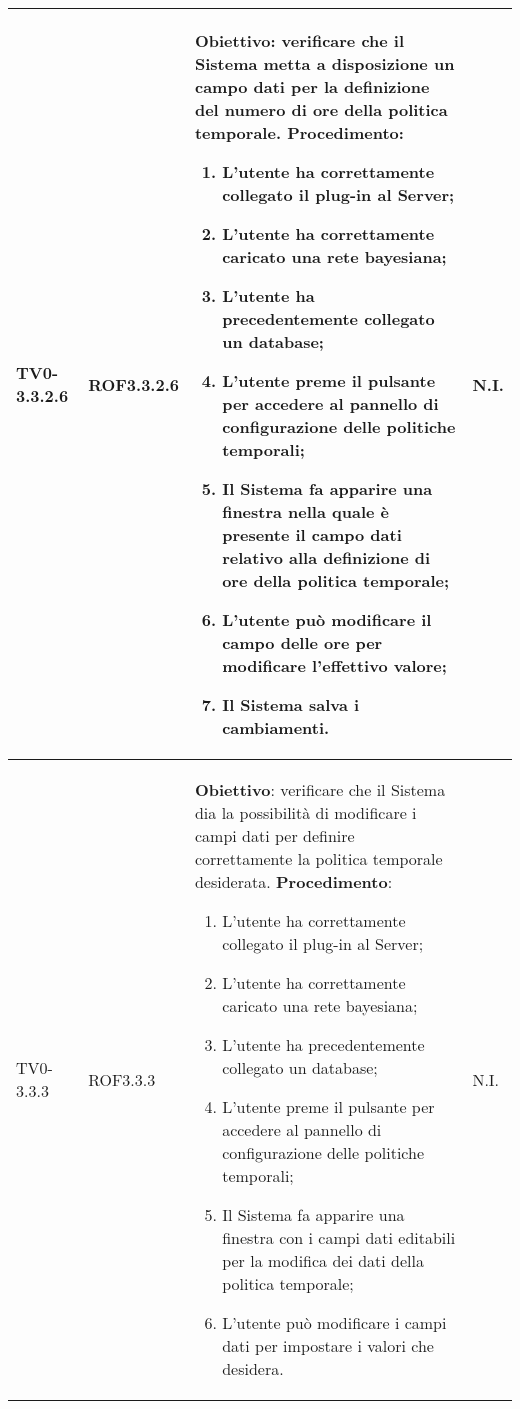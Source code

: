 \begin{longtable}{|C{.15\textwidth}|C{.13\textwidth}|m{.52\textwidth}|C{.08\textwidth}|}
TV0-3.3.2.6 & ROF3.3.2.6 &
	\textbf{Obiettivo}: verificare che il Sistema metta a disposizione un campo dati per la definizione del numero di ore della politica temporale. \newline
	\textbf{Procedimento}:
	\begin{enumerate}
		\item L'utente ha correttamente collegato il plug-in al Server;
		\item L'utente ha correttamente caricato una rete bayesiana;
		\item L'utente ha precedentemente collegato un database;
		\item L'utente preme il pulsante per accedere al pannello di configurazione delle politiche temporali;
		\item Il Sistema fa apparire una finestra nella quale è presente il campo dati relativo alla definizione di ore della politica temporale;
		\item L'utente può modificare il campo delle ore per modificare l'effettivo valore;
		\item Il Sistema salva i cambiamenti.
	\end{enumerate}
	& N.I. \\
\hline

TV0-3.3.3 & ROF3.3.3 &
	\textbf{Obiettivo}: verificare che il Sistema dia la possibilità di modificare i campi dati per definire correttamente la politica temporale desiderata. \newline
	\textbf{Procedimento}:
	\begin{enumerate}
		\item L'utente ha correttamente collegato il plug-in al Server;
		\item L'utente ha correttamente caricato una rete bayesiana;
		\item L'utente ha precedentemente collegato un database;
		\item L'utente preme il pulsante per accedere al pannello di configurazione delle politiche temporali;
		\item Il Sistema fa apparire una finestra con i campi dati editabili per la modifica dei dati della politica temporale;
		\item L'utente può modificare i campi dati per impostare i valori che desidera.
	\end{enumerate}
	& N.I. \\
\hline


\end{longtable}
